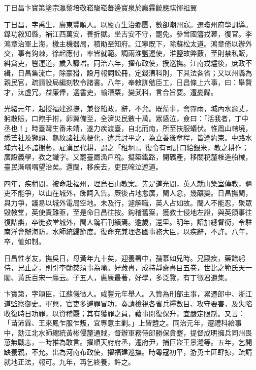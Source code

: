 
\begin{pinyinscope}
丁日昌卞寶第塗宗瀛黎培敬崧駿崧蕃邊寶泉於廕霖饒應祺惲祖翼

丁日昌，字禹生，廣東豐順人。以廩貢生治鄉團，數卻潮州寇。選瓊州府學訓導。錄功敘知縣，補江西萬安，善折獄。坐吉安不守，罷免。參曾國籓戎幕，復官。李鴻章治軍上海，檄主機器局，積勛至知府。江寧既下，除蘇松太道。鴻章倚以辦外交，事有鉤棘，徐起應付，率皆就範。調兩淮鹽運使，淮鹽故弊藪，至則禁私販，糾貪吏，鬯運道，歲入驟增。同治六年，擢布政使，授巡撫。江南戎燼後，庶政不緝，日昌集流亡，除豪猾，設月報詞訟冊，定錢漕科則，下其法各省；又以州縣為親民官，疏請設局編刻牧令諸書。八年，奉敕訓勉臣工，日昌條上六事，曰：舉賢才，汰虛冗，益廉俸，選書吏，輸漕粟，變武科，言合旨要。遭憂歸。

光緒元年，起授福建巡撫，兼督船政，辭，不允。既蒞事，會霪雨，城內水逾丈，躬散賑，口煦手拊，卵翼備至，全濟災民數十萬。眾感泣，僉曰：「活我者，丁中丞也！」時臺灣生番未靖，遂力疾渡臺，自北而南，所至扶服蟻伏。惟鳳山轄境，悉芒社及獅頭、龜紋諸社素梗化，遣兵討平之，為立善後章程，皆遵約束。中路水埔六社不諳樹藝，雇漢民代耕，謂之「租坰」。復令有司計口給銀米，教之耕作；廣設義學，教之識字。又罷臺屬漁戶稅。擬築鐵路，開礦產，移關稅釐榷造船械，臺民漸喁喁望治矣。還閩，移疾去，吏民啼泣遮道。

四年，疾稍間，被命赴福州，理烏石山教案。先是道光間，英人就山築室傳教，疆吏不能爭，以山在城外，飾詞入告。厥後占地愈廣，閩人忿，幾釀變。日昌撫閩，與力爭，議易以城外電局空地。未及行，遽解職，英人占如故。閩人不能忍，聚眾毀教堂，英使責難亟，至是命日昌往按。鉤稽舊案，獲教士侵地左證，與英領事往復詰辯，卒徙教堂城外，閩人鑱石刊績焉。逾歲，還里。明年，詔加總督銜，令駐南洋會辦海防，水師統歸節度。復命充兼理各國事務大臣，以疾辭，不許。八年，卒，恤如制。

日昌性孝友，撫吳日，母黃年九十矣，迎養署中，孺慕如兒時。兄寢疾，藥饍躬侍，兄止之，則引李勣焚須事為喻。好藏書，成持靜齋書目五卷，世比之範氏天一閣、黃氏百宋一廛云。子五人，惠康最著，好學，多泛覽，有丁徵君遺集。

卞寶第，字頌臣，江蘇儀徵人。咸豐元年舉人。入貲為刑部主事，累遷郎中、浙江道監察御史。軍興，官吏多避罪冒功，奏請檢視各省兵糧數目、攻守要害，及失陷收復時日功罪，以資稽覈；其有獲罪之員，藉事開復保升，宜嚴定限制。又言：「苗沛霖、王來鳳乍服乍叛，宜專意主剿。」上皆韙之。同治元年，遷禮科給事中，劾江北水師總統黃彬侵釐通賊，督辦軍務侍郎勝保貪蹇，提督成明擁兵同州畏葸無戰志，一時推為敢言。擢順天府府丞，遷府尹，捕巨盜王景漋等。五年，乞開缺養親，不允。出為河南布政使，擢福建巡撫。時粵寇初平，游勇土匪肆掠，疏請就地正法，報可。九年，再乞終養，許之。


\end{pinyinscope}
